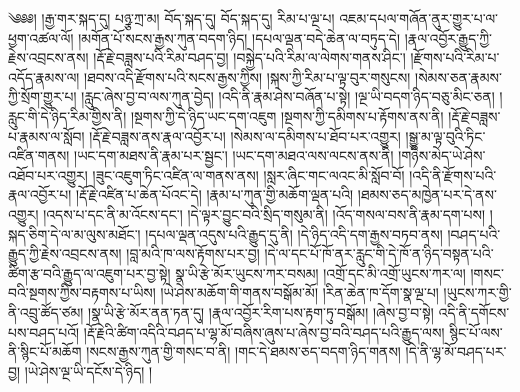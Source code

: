 \setcounter{footnote}{0} 
༄༅༅། །རྒྱ་གར་སྐད་དུ། པཉྩ་ཀྲ་མ། བོད་སྐད་དུ། བོད་སྐད་དུ། རིམ་པ་ལྔ་པ། འཇམ་དཔལ་གཞོན་ནུར་གྱུར་པ་ལ་ཕྱག་འཚལ་ལོ། །མགོན་པོ་སངས་རྒྱས་ཀུན་བདག་ཉིད། །དཔལ་ལྡན་བདེ་ཆེན་ལ་བཏུད་དེ། །རྣལ་འབྱོར་རྒྱུད་ཀྱི་རྗེས་འབྲངས་ནས། །རྡོ་རྗེ་བཟླས་པའི་རིམ་བཤད་བྱ། །བསྐྱེད་པའི་རིམ་ལ་ལེགས་གནས་ཤིང་། །རྫོགས་པའི་རིམ་པ་འདོད་རྣམས་ལ། །ཐབས་འདི་རྫོགས་པའི་སངས་རྒྱས་ཀྱིས། །སྐས་ཀྱི་རིམ་པ་ལྟ་བུར་གསུངས། །སེམས་ཅན་རྣམས་ཀྱི་སྲོག་གྱུར་པ། །རླུང་ཞེས་བྱ་བ་ལས་ཀུན་བྱེད། །འདི་ནི་རྣམ་ཤེས་བཞོན་པ་སྟེ། །ལྔ་ཡི་བདག་ཉིད་བཅུ་མིང་ཅན། །རླུང་གི་དེ་ཉིད་རིམ་གྱིས་ནི། །སྔགས་ཀྱི་དེ་ཉིད་ཡང་དག་འཇུག །སྔགས་ཀྱི་དམིགས་པ་རྟོགས་ནས་ནི། །རྡོ་རྗེ་བཟླས་པ་རྣམས་ལ་སློབ། །རྡོ་རྗེ་བཟླས་ནས་རྣལ་འབྱོར་པ། །སེམས་ལ་དམིགས་པ་ཐོབ་པར་འགྱུར། །སྒྱུ་མ་ལྟ་བུའི་ཏིང་འཛིན་གནས། །ཡང་དག་མཐས་ནི་རྣམ་པར་སྦྱང་། །ཡང་དག་མཐའ་ལས་ལངས་ནས་ནི། །གཉིས་མེད་ཡེ་ཤེས་འཐོབ་པར་འགྱུར། །ཟུང་འཇུག་ཏིང་འཛིན་ལ་གནས་ནས། །སླར་ཞིང་གང་ལའང་མི་སློབ་བོ། །འདི་ནི་རྫོགས་པའི་རྣལ་འབྱོར་པ། །རྡོ་རྗེ་འཛིན་པ་ཆེན་པོའང་དེ། །རྣམ་པ་ཀུན་གྱི་མཆོག་ལྡན་པའི། །ཐམས་ཅད་མཁྱེན་པར་དེ་ནས་འགྱུར། །འདས་པ་དང་ནི་མ་འོངས་དང་། །དེ་ལྟར་བྱུང་བའི་སྲིད་གསུམ་ནི། །འོད་གསལ་བས་ནི་རྣམ་དག་པས། །སྐད་ཅིག་དེ་ལ་མ་ལུས་མཐོང་། །དཔལ་ལྡན་འདུས་པའི་རྒྱུད་དུ་ནི། །དེ་ཉིད་འདི་དག་རྒྱས་བཏབ་ནས། །བཤད་པའི་རྒྱུད་ཀྱི་རྗེས་འབྲངས་ནས། །བླ་མའི་ཁ་ལས་རྟོགས་པར་བྱ། །དེ་ལ་དང་པོ་ཁོ་ནར་རླུང་གི་དེ་ཁོ་ན་ཉིད་བསྟན་པའི་ཚིག་རྩ་བའི་རྒྱུད་ལ་འཇུག་པར་བྱ་སྟེ། སྣ་ཡི་རྩེ་མོར་ཡུངས་ཀར་བསམ། །འགྲོ་དང་མི་འགྲོ་ཡུངས་ཀར་ལ། །གསང་བའི་སྔགས་ཀྱིས་བརྟགས་པ་ཡིས། །ཡེ་ཤེས་མཆོག་གི་གནས་བསྒོམ་མོ། །རིན་ཆེན་ཁ་དོག་སྣ་ལྔ་པ། །ཡུངས་ཀར་གྱི་ནི་འབྲུ་ཚོད་ཙམ། །སྣ་ཡི་རྩེ་མོར་ནན་ཏན་དུ། །རྣལ་འབྱོར་རིག་པས་རྟག་ཏུ་བསྒོམ། །ཞེས་བྱ་བ་སྟེ། འདི་ནི་དགོངས་པས་བཤད་པའོ། །རྡོ་རྗེའི་ཚིག་འདིའི་བཤད་པ་ལྷ་མོ་བཞིས་ཞུས་པ་ཞེས་བྱ་བའི་བཤད་པའི་རྒྱུད་ལས། སྙིང་པོ་ལས་ནི་སྙིང་པོ་མཆོག །སངས་རྒྱས་ཀུན་གྱི་གསང་བ་ནི། །གང་དེ་ཐམས་ཅད་བདག་ཉིད་གནས། །དེ་ནི་ལྷ་མོ་བཤད་པར་བྱ། །ཡེ་ཤེས་ལྔ་ཡི་དངོས་དེ་ཉིད། །
